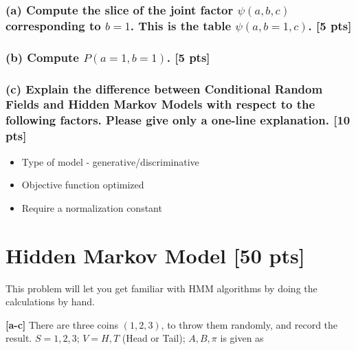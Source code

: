 \documentclass[twoside,11pt]{article}\usepackage{amsmath,amsfonts,amsthm,fullpage}
\begin{document}
\subsubsection*{(a) Compute the slice of the joint factor $\psi(a,b,c)$ corresponding to $b = 1$. This is the table $\psi(a,b=1,c)$. [5 pts]}

\subsubsection*{(b) Compute $P(a = 1,b = 1)$. [5 pts]}

\subsubsection*{(c) Explain the difference between Conditional Random Fields and Hidden
Markov Models with respect to the following factors. Please give
only a one-line explanation. [10 pts]}

\begin{itemize}
  \item Type of model - generative/discriminative
  \item Objective function optimized
  \item Require a normalization constant
\end{itemize}

\section{Hidden Markov Model [50 pts]}

This problem will let you get familiar with HMM algorithms by doing
the calculations by hand.

\textbf{[a-c]} There are three coins $(1,2,3)$, to throw them
randomly, and record the result. $S = {1,2,3}$; $V = {H,T}$ (Head or
Tail); $A, B, \pi$ is given as
\end{document}
